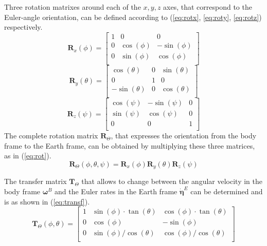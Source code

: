 \documentclass[journal]{IEEEtran}
\begin{document}
	Three rotation matrixes around each of the $x, y, z$ axes, that correspond to the Euler-angle orientation, can be defined according to (\ref{eq:rotx}, \ref{eq:roty}, \ref{eq:rotz}) respectively.
	\begin{equation} \label{eq:rotx}
	\bm{R}_x (\phi)=
	\left[ {\begin{array}{ccc}
		1 & 0 & 0 \\
		0 & \cos(\phi) & -\sin(\phi) \\
		0 &  \sin(\phi) & \cos(\phi) \\ 
		\end{array} } \right]
	\end{equation}  
	\begin{equation} \label{eq:roty}
	\bm{R}_y (\theta)=
	\left[ {\begin{array}{ccc}
		\cos(\theta) & 0 & \sin(\theta) \\
		0 & 1 & 0 \\
		-\sin(\theta) &  0 & \cos(\theta) \\ 
		\end{array} } \right]
	\end{equation}  
	\begin{equation} \label{eq:rotz}
	\bm{R}_z (\psi)=
	\left[ {\begin{array}{ccc}
		\cos(\psi) & -\sin(\psi) & 0 \\
		\sin(\psi) & \cos(\psi) & 0 \\
		0 &  0 & 1 \\ 
		\end{array} } \right]
	\end{equation}  
	The complete rotation matrix $\bm{R}_\Theta$, that expresses the orientation from the body frame to the Earth frame, can be obtained by multiplying these three matrices, as in (\ref{eq:rot}).
	\begin{equation} \label{eq:rot}
	\bm{R}_\Theta (\phi, \theta, \psi) = 	\bm{R}_x (\phi)  \bm{R}_y (\theta)  \bm{R}_z (\psi)
	\end{equation}  
	
	The transfer matrix $\bm{T}_\Theta$ that allows to change between the angular velocity in the body frame $\bm{\omega}^B$ and the Euler rates in the Earth frame $\bm{\dot \eta}^E$  can be determined and is as shown in (\ref{eq:transf}).
	\begin{equation} \label{eq:transf}
	\bm{T}_\Theta (\phi,\theta )= \left[ {\begin{array}{ccc}
		1 & \sin(\phi) \cdot \tan(\theta) & \cos(\phi) \cdot \tan (\theta) \\
		0 & \cos(\phi) & -\sin(\phi) \\
		0 &  \sin(\phi)/\cos(\theta) & \cos(\phi)/\cos(\theta)  \\ 
		\end{array} } \right]
	\end{equation}  
	
\end{document}
